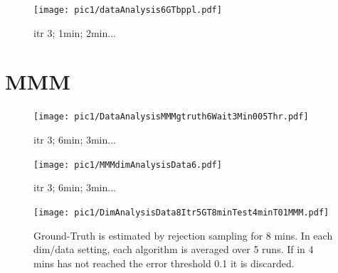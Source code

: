 \begin{figure}%
\centering
\texttt{[image: pic1/dataAnalysis6GTbppl.pdf]}
\caption{itr 3; 1min; 2min...}
\label{fig:pref}
\end{figure}

\newpage
\section{MMM}
\begin{figure}%
\centering
\texttt{[image: pic1/DataAnalysisMMMgtruth6Wait3Min005Thr.pdf]}
\caption{itr 3; 6min; 3min...}
\label{fig:pref}
\end{figure}

\begin{figure}%
\centering
\texttt{[image: pic1/MMMdimAnalysisData6.pdf]}
\caption{itr 3; 6min; 3min...}
\label{fig:pref}
\end{figure}


\begin{figure}%
\centering
\texttt{[image: pic1/DimAnalysisData8Itr5GT8minTest4minT01MMM.pdf]}
\caption{Ground-Truth is estimated by rejection sampling for 8 mins. In each dim/data setting, each algorithm is averaged over 5 runs. If in 4 mins has not reached the error threshold 0.1 it is discarded.}
\label{fig:pref}
\end{figure}

